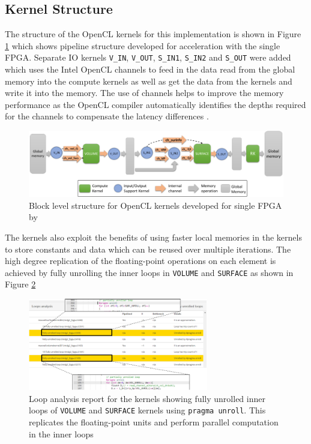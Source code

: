 \subsection{Kernel Structure}

The structure of the OpenCL kernels for this implementation is shown in Figure \ref{fig:singlefpga_kernstruc}
which shows pipeline structure developed for acceleration with the single FPGA.
Separate IO kernels \texttt{V\_IN}, \texttt{V\_OUT}, \texttt{S\_IN1}, \texttt{S\_IN2}
and \texttt{S\_OUT} were added which uses the Intel OpenCL channels to feed in the data
read from the global memory into the compute kernels as well as get the data from the
kernels and write it into the memory. The use of channels helps to improve the
memory performance as the OpenCL compiler automatically identifies the depths
required for the channels to compensate the latency differences \cite{kenter_opencl-based_2018}.
\begin{figure}[ht]%
    \centering
    \includegraphics[width=1.0\textwidth]{images/nb_kernstruc}
    \caption{Block level structure for OpenCL kernels developed for single FPGA by \textcite{kenter_opencl-based_2018}}
    \label{fig:singlefpga_kernstruc}
\end{figure}

The kernels also exploit the benefits of using faster local memories in the kernels
to store constants and data which can be reused over multiple iterations. The high
degree replication of the floating-point operations on each element is achieved
by fully unrolling the inner loops in \texttt{VOLUME} and \texttt{SURFACE} as shown
in Figure \ref{fig:loop_report}
\begin{figure}[ht]%
    \centering
    \includegraphics[width=0.7\textwidth]{images/loop_report}
    \caption{Loop analysis report for the kernels showing fully unrolled inner
    loops of \texttt{VOLUME} and \texttt{SURFACE} kernels using \texttt{pragma unroll}.
    This replicates the floating-point units and perform parallel computation in
    the inner loops}
    \label{fig:loop_report}
\end{figure}

